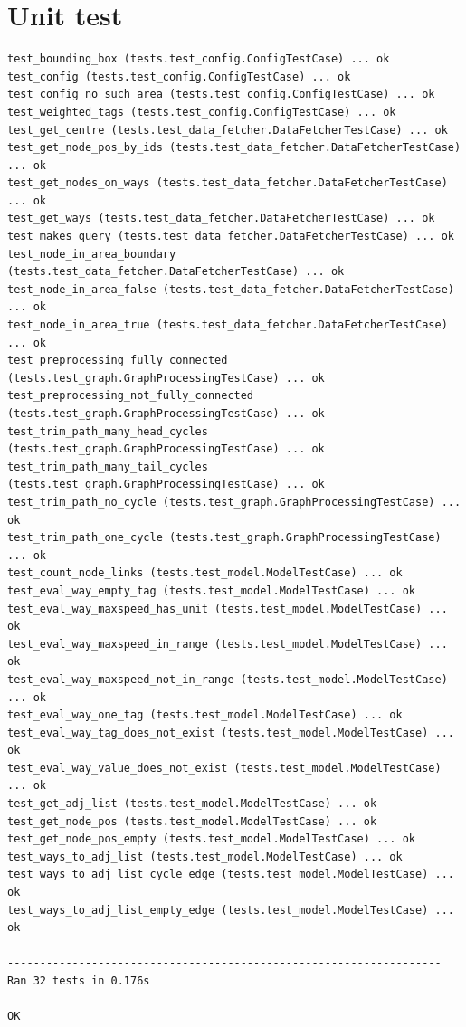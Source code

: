 \documentclass[12pt,a4paper]{report}
\begin{document}
\section*{Unit test}
\begin{lstlisting}
test_bounding_box (tests.test_config.ConfigTestCase) ... ok
test_config (tests.test_config.ConfigTestCase) ... ok
test_config_no_such_area (tests.test_config.ConfigTestCase) ... ok
test_weighted_tags (tests.test_config.ConfigTestCase) ... ok
test_get_centre (tests.test_data_fetcher.DataFetcherTestCase) ... ok
test_get_node_pos_by_ids (tests.test_data_fetcher.DataFetcherTestCase) ... ok
test_get_nodes_on_ways (tests.test_data_fetcher.DataFetcherTestCase) ... ok
test_get_ways (tests.test_data_fetcher.DataFetcherTestCase) ... ok
test_makes_query (tests.test_data_fetcher.DataFetcherTestCase) ... ok
test_node_in_area_boundary (tests.test_data_fetcher.DataFetcherTestCase) ... ok
test_node_in_area_false (tests.test_data_fetcher.DataFetcherTestCase) ... ok
test_node_in_area_true (tests.test_data_fetcher.DataFetcherTestCase) ... ok
test_preprocessing_fully_connected (tests.test_graph.GraphProcessingTestCase) ... ok
test_preprocessing_not_fully_connected (tests.test_graph.GraphProcessingTestCase) ... ok
test_trim_path_many_head_cycles (tests.test_graph.GraphProcessingTestCase) ... ok
test_trim_path_many_tail_cycles (tests.test_graph.GraphProcessingTestCase) ... ok
test_trim_path_no_cycle (tests.test_graph.GraphProcessingTestCase) ... ok
test_trim_path_one_cycle (tests.test_graph.GraphProcessingTestCase) ... ok
test_count_node_links (tests.test_model.ModelTestCase) ... ok
test_eval_way_empty_tag (tests.test_model.ModelTestCase) ... ok
test_eval_way_maxspeed_has_unit (tests.test_model.ModelTestCase) ... ok
test_eval_way_maxspeed_in_range (tests.test_model.ModelTestCase) ... ok
test_eval_way_maxspeed_not_in_range (tests.test_model.ModelTestCase) ... ok
test_eval_way_one_tag (tests.test_model.ModelTestCase) ... ok
test_eval_way_tag_does_not_exist (tests.test_model.ModelTestCase) ... ok
test_eval_way_value_does_not_exist (tests.test_model.ModelTestCase) ... ok
test_get_adj_list (tests.test_model.ModelTestCase) ... ok
test_get_node_pos (tests.test_model.ModelTestCase) ... ok
test_get_node_pos_empty (tests.test_model.ModelTestCase) ... ok
test_ways_to_adj_list (tests.test_model.ModelTestCase) ... ok
test_ways_to_adj_list_cycle_edge (tests.test_model.ModelTestCase) ... ok
test_ways_to_adj_list_empty_edge (tests.test_model.ModelTestCase) ... ok

-------------------------------------------------------------------
Ran 32 tests in 0.176s

OK
\end{lstlisting}
\end{document}
